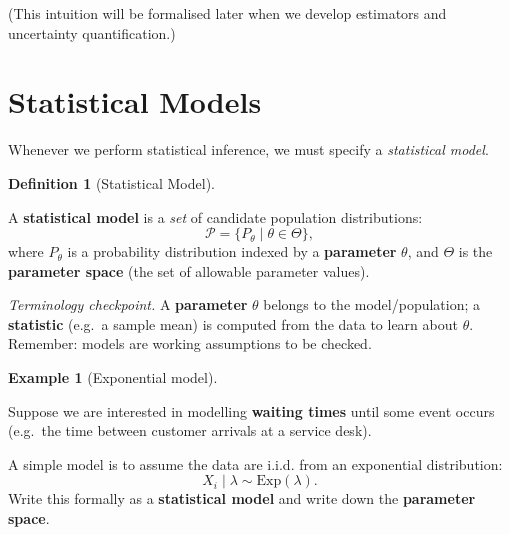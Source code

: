 \documentclass[
  letterpaper,
  DIV=11,
  numbers=noendperiod]{scrreprt}
\theoremstyle{definition}
\newtheorem{example}{Example}[chapter]
\theoremstyle{plain}
\theoremstyle{definition}
\newtheorem{definition}{Definition}[chapter]
\theoremstyle{remark}
\begin{document}
(This intuition will be formalised later when we develop estimators and
uncertainty quantification.)

\section{Statistical Models}\label{statistical-models}

Whenever we perform statistical inference, we must specify a
\emph{statistical model}.

\begin{definition}[Statistical
Model]\protect\hypertarget{def-model}{}\label{def-model}

A \textbf{statistical model} is a \emph{set} of candidate population
distributions: \[
\mathcal{P}=\{P_\theta \mid \theta\in\Theta\},
\] where \(P_\theta\) is a probability distribution indexed by a
\textbf{parameter} \(\theta\), and \(\Theta\) is the \textbf{parameter
space} (the set of allowable parameter values).

\end{definition}

\emph{Terminology checkpoint.} A \textbf{parameter} \(\theta\) belongs
to the model/population; a \textbf{statistic} (e.g.~a sample mean) is
computed from the data to learn about \(\theta\). Remember: models are
working assumptions to be checked.

\begin{example}[Exponential
model]\protect\hypertarget{exm-exponential-model}{}\label{exm-exponential-model}

Suppose we are interested in modelling \textbf{waiting times} until some
event occurs\\
(e.g.~the time between customer arrivals at a service desk).

A simple model is to assume the data are i.i.d. from an exponential
distribution: \[
X_i \mid \lambda \sim \mathrm{Exp}(\lambda).
\] Write this formally as a \textbf{statistical model} and write down
the \textbf{parameter space}.

\end{example}
\end{document}
